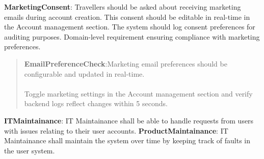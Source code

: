 \textbf{MarketingConsent}: Travellers should be asked about receiving marketing emails during account creation. This consent should be editable in real-time in the Account management section. The system should log consent preferences for auditing purposes. Domain-level requirement ensuring compliance with marketing preferences.
\begin{quote}
    \textbf{EmailPreferenceCheck}:Marketing email preferences should be configurable and updated in real-time. \\ \\ 
    Toggle marketing settings in the Account management section and verify backend logs reflect changes within 5 seconds.
\end{quote}
\textbf{ITMaintainance}: IT Maintainance shall be able to handle requests from users with issues relating to their user accounts.
\textbf{ProductMaintainance}: IT Maintainance shall maintain the system over time by keeping track of faults in the user system.

